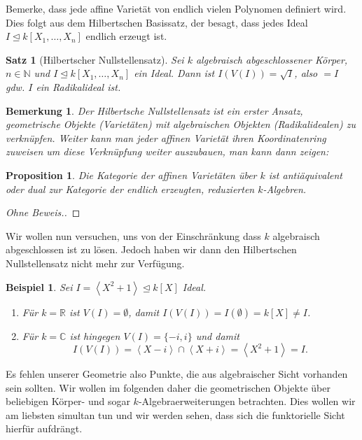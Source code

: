 \documentclass[a4paper, 11pt]{scrartcl}
\newcommand{\N}{\mathbb{N}}
\newcommand{\R}{\mathbb{R}}
\newcommand{\C}{\mathbb{C}}
\newcommand{\brackets}[1]{\left\langle #1 \right\rangle}
\theoremstyle{basicstyle}
\newtheorem{bemerkung}[definition]{Bemerkung}
\newtheorem{beispiel}[definition]{Beispiel}
\newtheorem{satz}[definition]{Satz}
\newtheorem{proposition}[definition]{Proposition}
\begin{document}
    Bemerke, dass jede affine Varietät von endlich vielen Polynomen definiert wird.
    Dies folgt aus dem Hilbertschen Basissatz, der besagt, dass jedes Ideal \(I \trianglelefteq k[X_1, \ldots, X_n]\) endlich erzeugt ist.

    \begin{satz}[Hilbertscher Nullstellensatz]
        Sei \(k\) algebraisch abgeschlossener Körper, \(n \in \N\) und \(I \trianglelefteq k[X_1, \ldots, X_n]\) ein Ideal.
        Dann ist \(I(V(I)) = \sqrt{I}\), also \(= I\) gdw. \(I\) ein Radikalideal ist.
    \end{satz}

    \begin{bemerkung}
        Der Hilbertsche Nullstellensatz ist ein erster Ansatz, geometrische Objekte (Varietäten) mit algebraischen Objekten (Radikalidealen) zu verknüpfen.
        Weiter kann man jeder affinen Varietät ihren Koordinatenring zuweisen um diese Verknüpfung weiter auszubauen, man kann dann zeigen:
    \end{bemerkung}

    \begin{proposition}
        Die Kategorie der affinen Varietäten über \(k\) ist antiäquivalent oder dual zur Kategorie der endlich erzeugten, reduzierten \(k\)-Algebren.
    \end{proposition}
    \begin{proof}[Ohne Beweis.]
    \end{proof}

    Wir wollen nun versuchen, uns von der Einschränkung dass \(k\) algebraisch abgeschlossen ist zu lösen.
    Jedoch haben wir dann den Hilbertschen Nullstellensatz nicht mehr zur Verfügung.

    \begin{beispiel}
        Sei \(I = \brackets{X^2 + 1} \trianglelefteq k[X]\) Ideal.
        \begin{enumerate}
            \item Für \(k = \R\) ist \(V(I) = \emptyset\), damit \(I(V(I)) = I(\emptyset) = k[X] \neq I\).
            \item Für \(k = \C\) ist hingegen \(V(I) = \{-i, i\}\) und damit 
                \[I(V(I)) = \brackets{X - i} \cap \brackets{X + i} = \brackets{X^2 + 1} = I.\]
        \end{enumerate}
    \end{beispiel}

    Es fehlen unserer Geometrie also Punkte, die aus algebraischer Sicht vorhanden sein sollten.
    Wir wollen im folgenden daher die geometrischen Objekte über beliebigen Körper- und sogar \(k\)-Algebraerweiterungen betrachten.
    Dies wollen wir am liebsten simultan tun und wir werden sehen, dass sich die funktorielle Sicht hierfür aufdrängt.
\end{document}
